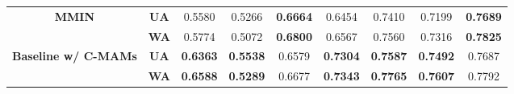 \begin{table}[htb!]
\begin{tabular}{c|c|ccccccc}
\multirow{2}{*}{\textbf{MMIN}}               & \textbf{UA}                      & 0.5580          & 0.5266          & \textbf{0.6664} & 0.6454          & 0.7410          & 0.7199          & \textbf{0.7689} \\
                                             & \textbf{WA}                      & 0.5774          & 0.5072          & \textbf{0.6800} & 0.6567          & 0.7560          & 0.7316          & \textbf{0.7825} \\
\multirow{2}{*}{\textbf{Baseline w/ C-MAMs}} & \textbf{UA}                      & \textbf{0.6363} & \textbf{0.5538} & 0.6579          & \textbf{0.7304} & \textbf{0.7587} & \textbf{0.7492} & 0.7687          \\
                                             & \textbf{WA}                      & \textbf{0.6588} & \textbf{0.5289} & 0.6677          & \textbf{0.7343} & \textbf{0.7765} & \textbf{0.7607} & 0.7792          \\ \hline
\end{tabular}%
\end{table}